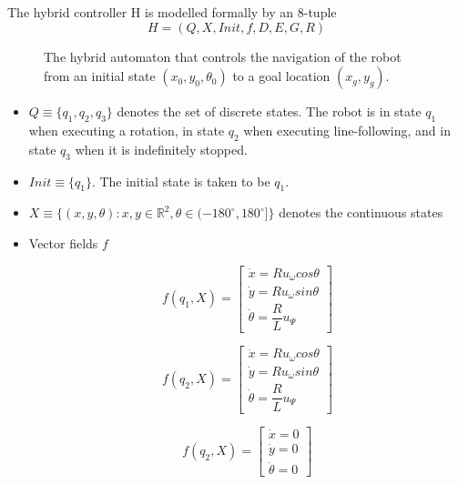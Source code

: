 The hybrid controller H is modelled formally by an 8-tuple
$$H=(Q,X,Init,f,D,E,G,R)$$


\begin{figure}[H]\centering
  \scalebox{0.7}{}
  \caption{The hybrid automaton that controls the navigation of the robot
    from an initial state $(x_0, y_0, \theta_0)$ to a goal location $(x_g, y_g)$.}
  \label{}
\end{figure}

\begin{itemize}

\item
  $Q \equiv \{q_1 ,q_2 ,q_3\}$ denotes the set of discrete states. The robot is in
  state $q_1$ when executing a rotation, in state $q_2$ when executing
  line-following, and in state $q_3$ when it is indefinitely stopped.

\item
  $Init \equiv \{q_1\}$. The initial state is taken to be $q_1$.

\item
  $X \equiv \{(x,y,\theta): x,y \in \mathbb{R}^2, \theta \in(-180^{\circ}, 180^{\circ}] \}$
  denotes the continuous states

\item
  Vector fields $f$

  \begin{equation*}
    f(q_1, X) =
    \begin{bmatrix}
      \dot{x} = R u_{\omega} cos\theta      \\
      \dot{y} = R u_{\omega} sin\theta      \\
      \dot{\theta} = \dfrac{R}{L} u_{\Psi}
    \end{bmatrix}
  \end{equation*}

  \begin{equation*}
    f(q_2, X) =
    \begin{bmatrix}
      \dot{x} = R u_{\omega} cos\theta      \\
      \dot{y} = R u_{\omega} sin\theta      \\
      \dot{\theta} = \dfrac{R}{L} u_{\Psi}
    \end{bmatrix}
  \end{equation*}

  \begin{equation*}
    f(q_2, X) =
    \begin{bmatrix}
      \dot{x} = 0       \\
      \dot{y} = 0       \\
      \dot{\theta} = 0
    \end{bmatrix}
  \end{equation*}


\end{itemize}
